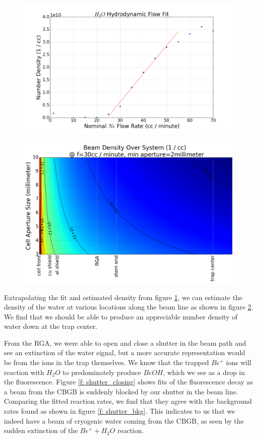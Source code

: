 \documentclass[a4paper]{article}
\begin{document}
\begin{figure}[H]
\centering
\includegraphics[width=1\textwidth]{hydrodynamic_fit.png}
\caption{}
\label{f: rga}
\end{figure}

\begin{figure}[H]
\centering
\includegraphics[width=1\textwidth]{beam_density_over_system.png}
\caption{}
\label{f: beam_density}
\end{figure}

Extrapolating the fit and estimated density from figure \ref{f: rga}, we can estimate the density of the water at various locations along the beam line as shown in figure \ref{f: beam_density}. We find that we should be able to produce an appreciable number density of water down at the trap center.

From the RGA, we were able to open and close a shutter in the beam path and see an extinction of the water signal, but a more accurate representation would be from the ions in the trap themselves. We know that the trapped $Be^+$ ions will reaction with $H_2O$ to predominately produce $BeOH$, which we see as a drop in the fluorescence. Figure \ref{f: shutter_closing} shows fits of the fluorescence decay as a beam from the CBGB is suddenly blocked by our shutter in the beam line. Comparing the fitted reaction rates, we find that they agree with the background rates found as shown in figure \ref{f: shutter_bkg}. This indicates to us that we indeed have a beam of cryogenic water coming from the CBGB, as seen by the sudden extinction of the $Be^+ + H_2O$ reaction.
\end{document}
